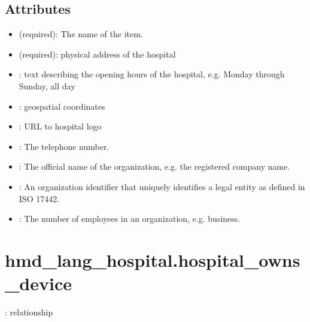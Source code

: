 \documentclass[letterpaper,10pt,english,openany,oneside]{sphinxmanual}
\begin{document}
\subsection{Attributes}
\label{\detokenize{classes/hmd_lang_hospital/hospital:attributes}}\begin{itemize}
\item {} 
\sphinxAtStartPar
{} (required): The name of the item.

\item {} 
\sphinxAtStartPar
{} (required): physical address of the hospital

\item {} 
\sphinxAtStartPar
{} : text describing the opening hours of the hospital, e.g. Monday through Sunday, all day

\item {} 
\sphinxAtStartPar
{} : geospatial coordinates

\item {} 
\sphinxAtStartPar
{} : URL to hospital logo

\item {} 
\sphinxAtStartPar
{} : The telephone number.

\item {} 
\sphinxAtStartPar
{} : The official name of the organization, e.g. the registered company name.

\item {} 
\sphinxAtStartPar
{} : An organization identifier that uniquely identifies a legal entity as defined in ISO 17442.

\item {} 
\sphinxAtStartPar
{} : The number of employees in an organization, e.g. business.

\end{itemize}

\sphinxstepscope


\section{hmd\_lang\_hospital.hospital\_owns\_device}
\label{\detokenize{classes/hmd_lang_hospital/hospital_owns_device:hmd-lang-hospital-hospital-owns-device}}\label{\detokenize{classes/hmd_lang_hospital/hospital_owns_device::doc}}
\sphinxAtStartPar
{}: relationship
\end{document}
